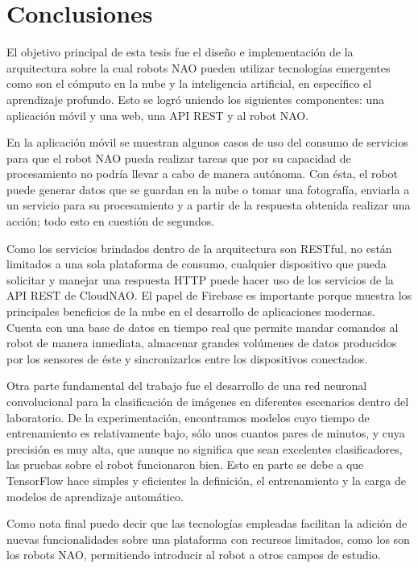\chapter*{Conclusiones}
\label{\detokenize{conclusion:cloudnao-una-arquitectura-de-software-para-la-integracion-de-computo-en-la-nube-con-robots-nao}}\label{\detokenize{conclusion:conclusion}}\label{\detokenize{conclusion::doc}}


El objetivo principal de esta tesis fue el diseño e 
implementación de
la arquitectura sobre la cual robots NAO pueden
utilizar tecnologías emergentes como son el cómputo en la nube
y la inteligencia artificial, en específico el aprendizaje 
profundo. Esto se logró uniendo los siguientes componentes:
una aplicación móvil y una web, una API REST y al robot NAO.

En la aplicación
móvil se muestran algunos casos de uso del consumo de
servicios para que el robot NAO pueda realizar tareas
que por su capacidad de procesamiento no podría 
llevar a cabo de manera autónoma.
Con ésta, el robot puede generar datos que
se guardan en la nube o tomar una fotografía,
enviarla a un servicio para su procesamiento y a partir
de la respuesta obtenida realizar una acción; todo
esto en cuestión de segundos.

Como los servicios brindados dentro de la arquitectura son 
RESTful, no están limitados a una sola plataforma
de consumo, cualquier dispositivo que pueda solicitar y
manejar una respuesta HTTP puede hacer uso de los servicios
de la API REST de CloudNAO.
El papel de Firebase es importante porque muestra
los principales beneficios de la nube en el desarrollo
de aplicaciones modernas. Cuenta con una base de datos en tiempo
real que permite mandar comandos al robot de manera
inmediata, almacenar grandes volúmenes de datos
producidos por los sensores de éste y sincronizarlos entre los dispositivos
conectados.

Otra parte fundamental del trabajo fue el desarrollo
de una red neuronal convolucional para la clasificación
de imágenes en diferentes escenarios dentro del laboratorio.
De la experimentación, encontramos modelos
cuyo tiempo de entrenamiento es relativamente bajo, sólo unos 
cuantos pares de minutos, y cuya precisión es muy alta, que 
aunque no significa que sean excelentes clasificadores,
las pruebas sobre el robot funcionaron bien.
Esto en parte se debe a que
TensorFlow hace simples y eficientes
la definición, el entrenamiento y la carga de modelos de 
aprendizaje automático. 

Como nota final puedo decir que las tecnologías empleadas
facilitan la adición
de nuevas funcionalidades sobre una plataforma con recursos
limitados, como los son los robots NAO,
permitiendo introducir al robot a otros campos de estudio.
